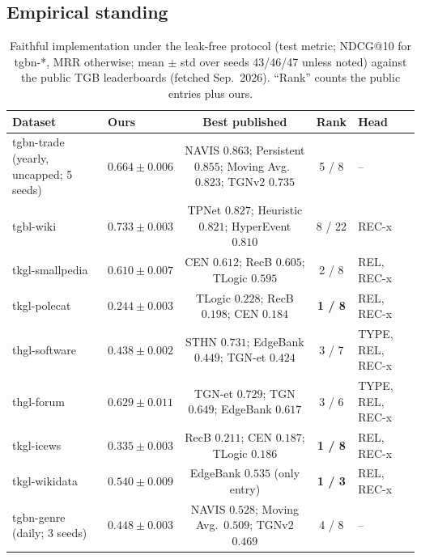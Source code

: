 \subsection{Empirical standing}
\label{app:faithful:results}

\begin{table}[h]
\centering\small
\caption{Faithful implementation under the leak-free protocol (test metric;
NDCG@10 for tgbn-*, MRR otherwise; mean $\pm$ std over seeds 43/46/47 unless
noted) against the public TGB leaderboards (fetched Sep.\ 2026). ``Rank''
counts the public entries plus ours.}
\begin{tabular}{llccl}
\toprule
Dataset & Ours & Best published & Rank & Head \\
\midrule
tgbn-trade (yearly, uncapped; 5 seeds) & $0.664 \pm 0.006$ & NAVIS $0.863$; Persistent $0.855$; Moving Avg.\ $0.823$; TGNv2 $0.735$ & 5 / 8 & -- \\
tgbl-wiki & $0.733 \pm 0.003$ & TPNet $0.827$; Heuristic $0.821$; HyperEvent $0.810$ & 8 / 22 & REC-x \\
tkgl-smallpedia & $0.610 \pm 0.007$ & CEN $0.612$; RecB $0.605$; TLogic $0.595$ & 2 / 8 & REL, REC-x \\
tkgl-polecat & $\mathbf{0.244 \pm 0.003}$ & TLogic $0.228$; RecB $0.198$; CEN $0.184$ & \textbf{1 / 8} & REL, REC-x \\
thgl-software & $0.438 \pm 0.002$ & STHN $0.731$; EdgeBank $0.449$; TGN-et $0.424$ & 3 / 7 & TYPE, REL, REC-x \\
thgl-forum & $0.629 \pm 0.011$ & TGN-et $0.729$; TGN $0.649$; EdgeBank $0.617$ & 3 / 6 & TYPE, REL, REC-x \\
tkgl-icews & $\mathbf{0.335 \pm 0.003}$ & RecB $0.211$; CEN $0.187$; TLogic $0.186$ & \textbf{1 / 8} & REL, REC-x \\
tkgl-wikidata & $\mathbf{0.540 \pm 0.009}$ & EdgeBank $0.535$ (only entry) & \textbf{1 / 3} & REL, REC-x \\
tgbn-genre (daily; 3 seeds) & $0.448 \pm 0.003$ & NAVIS $0.528$; Moving Avg.\ $0.509$; TGNv2 $0.469$ & 4 / 8 & -- \\
\bottomrule
\end{tabular}
\end{table}

